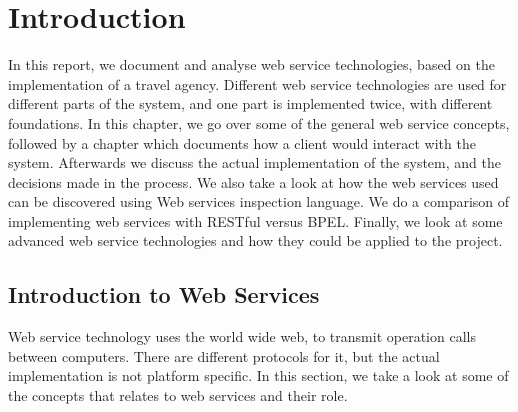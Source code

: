 \chapter{Introduction}
In this report, we document and analyse web service technologies, based on the implementation of a travel agency. Different web service technologies are used for different parts of the system, and one part is implemented twice, with different foundations. In this chapter, we go over some of the general web service concepts, followed by a chapter which documents how a client would interact with the system. Afterwards we discuss the actual implementation of the system, and the decisions made in the process. We also take a look at how the web services used can be discovered using Web services inspection language. We do a comparison of implementing web services with RESTful versus BPEL. Finally, we look at some advanced web service technologies and how they could be applied to the project.


\section{Introduction to Web Services}

Web service technology uses the world wide web, to transmit operation calls between computers. There are different protocols for it, but the actual implementation is not platform specific. In this section, we take a look at some of the concepts that relates to web services and their role. 


